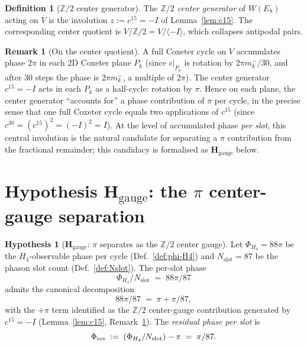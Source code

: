 \documentclass[11pt, a4paper]{amsart}
\theoremstyle{definition}
\newtheorem{definition}[theorem]{Definition}
\newtheorem{remark}[theorem]{Remark}
\newtheorem{hypothesis}[theorem]{Hypothesis}
\newcommand{\Z}{\mathbb{Z}}
\newcommand{\Hgauge}{\mathbf{H}_{\mathrm{gauge}}}
\newcommand{\Nslot}{N_{\mathrm{slot}}}
\newcommand{\PhiHfour}{\Phi_{H_4}}
\begin{document}
\begin{definition}[$\Z/2$ center generator]
\label{def:center}
The \emph{$\Z/2$ center generator} of $W(E_8)$ acting on
$V$ is the involution $z := c^{15} = -I$ of
Lemma~\ref{lem:c15}. The corresponding center quotient is
$V / \Z/2 = V / \langle -I \rangle$, which collapses
antipodal pairs.
\end{definition}

\begin{remark}[On the center quotient]
\label{rmk:center-pi}
A full Coxeter cycle on $V$ accumulates phase $2\pi$ in each
$2$D Coxeter plane $P_k$ (since $c|_{P_k}$ is rotation by
$2\pi m_k^- / 30$, and after $30$ steps the phase is
$2\pi m_k^-$, a multiple of $2\pi$). The center generator
$c^{15} = -I$ acts in each $P_k$ as a half-cycle: rotation
by $\pi$. Hence on each plane, the center generator
``accounts for'' a phase contribution of $\pi$ per cycle,
in the precise sense that one full Coxeter cycle equals
two applications of $c^{15}$ (since $c^{30} = (c^{15})^2 =
(-I)^2 = I$). At the level of accumulated phase
\emph{per slot}, this central involution is the natural
candidate for separating a $\pi$ contribution from the
fractional remainder; this candidacy is formalised as
$\Hgauge$ below.
\end{remark}

\section{Hypothesis $\Hgauge$: the $\pi$ center-gauge
  separation}
\label{sec:Hgauge}

\begin{hypothesis}[$\Hgauge$: $\pi$ separates as the
  $\Z/2$ center gauge]
\label{hyp:Hgauge}
Let $\PhiHfour = 88\pi$ be the $H_4$-observable phase per
cycle (Def.~\ref{def:phi-H4}) and $\Nslot = 87$ be the
phason slot count (Def.~\ref{def:Nslot}). The per-slot
phase
\[
  \PhiHfour / \Nslot \;=\; 88\pi / 87
\]
admits the canonical decomposition
\[
  88\pi / 87 \;=\; \pi + \pi/87,
\]
with the $+\pi$ term identified as the $\Z/2$ center-gauge
contribution generated by $c^{15} = -I$
(Lemma~\ref{lem:c15}, Remark~\ref{rmk:center-pi}). The
\emph{residual phase per slot} is
\[
  \Phi_{\rm res} \;:=\; (\PhiHfour / \Nslot) - \pi
                 \;=\; \pi/87.
\]
\end{hypothesis}
\end{document}
